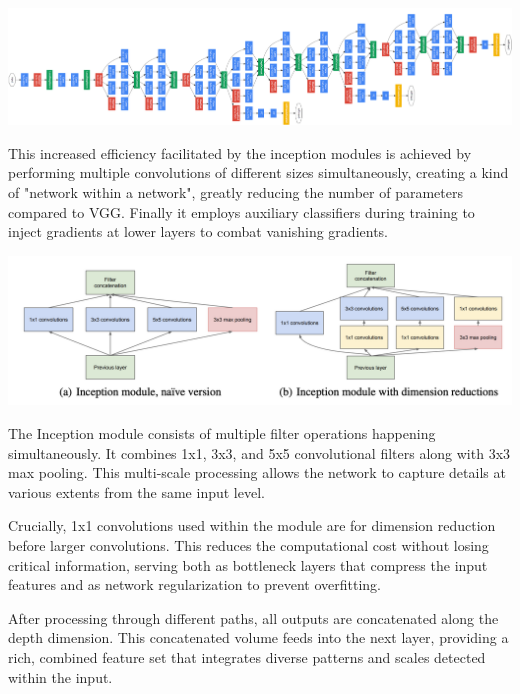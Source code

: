 \documentclass{article}
\begin{document}
        \begin{center}
            \includegraphics[scale=0.35]{images/GoogleNet.png}
        \end{center}
        
        This increased efficiency facilitated by the inception modules is achieved by performing multiple convolutions of different sizes simultaneously, creating a kind of "network within a network", greatly reducing the number of parameters compared to VGG. Finally it employs auxiliary classifiers during training to inject gradients at lower layers to combat vanishing gradients.

        \begin{center}
            \includegraphics[scale=0.2]{images/inceptionmodule.png}
        \end{center}
        
        The Inception module consists of multiple filter operations happening simultaneously. It combines 1x1, 3x3, and 5x5 convolutional filters along with 3x3 max pooling. This multi-scale processing allows the network to capture details at various extents from the same input level.

        Crucially, 1x1 convolutions used within the module are for dimension reduction before larger convolutions. This reduces the computational cost without losing critical information, serving both as bottleneck layers that compress the input features and as network regularization to prevent overfitting.

        After processing through different paths, all outputs are concatenated along the depth dimension. This concatenated volume feeds into the next layer, providing a rich, combined feature set that integrates diverse patterns and scales detected within the input.
        
\end{document}
